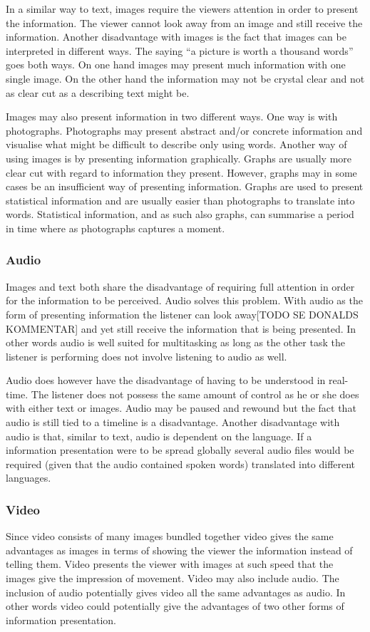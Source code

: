 In a similar way to text, images require the viewers attention in order to present the information. The viewer cannot look away from an image and still receive the information. Another disadvantage with images is the fact that images can be interpreted in different ways. The saying ``a picture is worth a thousand words'' goes both ways. On one hand images may present much information with one single image. On the other hand the information may not be crystal clear and not as clear cut as a describing text might be.

Images may also present information in two different ways. One way is with photographs. Photographs may present abstract and/or concrete information and visualise what might be difficult to describe only using words. Another way of using images is by presenting information graphically. Graphs are usually more clear cut with regard to information they present. However, graphs may in some cases be an insufficient way of presenting information. Graphs are used to present statistical information and are usually easier than photographs to translate into words. Statistical information, and as such also graphs, can summarise a period in time where as photographs captures a moment. 

\subsubsection{Audio}
Images and text both share the disadvantage of requiring full attention in order for the information to be perceived. Audio solves this problem. With audio as the form of presenting information the listener can look away[TODO SE DONALDS KOMMENTAR] and yet still receive the information that is being presented. In other words audio is well suited for multitasking as long as the other task the listener is performing does not involve listening to audio as well.

Audio does however have the disadvantage of having to be understood in real-time. The listener does not possess the same amount of control as he or she does with either text or images. Audio may be paused and rewound but the fact that audio is still tied to a timeline is a disadvantage. Another disadvantage with audio is that, similar to text, audio is dependent on the language. If a information presentation were to be spread globally several audio files would be required (given that the audio contained spoken words) translated into different languages.

\subsubsection{Video}
Since video consists of many images bundled together video gives the same advantages as images in terms of showing the viewer the information instead of telling them. Video presents the viewer with images at such speed that the images give the impression of movement. Video may also include audio. The inclusion of audio potentially gives video all the same advantages as audio. In other words video could potentially give the advantages of two other forms of information presentation.

